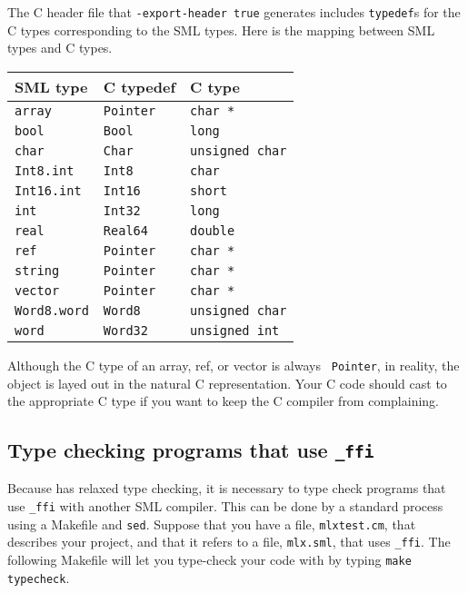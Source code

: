 The C header file that {\tt -export-header true} generates includes
{\tt typedef}s for the C types corresponding to the SML types.  Here
is the mapping between SML types and C types.

\begin{center}
\begin{tabular}{lll}
SML type & C typedef & C type\\
\hline
{\tt array} & {\tt Pointer} & {\tt char *} \\
{\tt bool} & {\tt Bool} & {\tt long} \\
{\tt char} & {\tt Char} & {\tt unsigned char} \\
{\tt Int8.int} & {\tt Int8} & {\tt char} \\
{\tt Int16.int} & {\tt Int16} & {\tt short} \\
{\tt int} & {\tt Int32} & {\tt long} \\
{\tt real} & {\tt Real64} & {\tt double} \\
{\tt ref} & {\tt Pointer} & {\tt char *} \\
{\tt string} & {\tt Pointer} & {\tt char *} \\
{\tt vector} & {\tt Pointer} & {\tt char *} \\
{\tt Word8.word} & {\tt Word8} & {\tt unsigned char} \\
{\tt word} & {\tt Word32} & {\tt unsigned int} \\
\end{tabular}
\end{center}

Although the C type of an array, ref, or vector is always {\tt
Pointer}, in reality, the object is layed out in the natural C
representation.  Your C code should cast to the appropriate C type if
you want to keep the C compiler from complaining.

\subsection{Type checking programs that use {\tt \_ffi}}

Because {\mlton} has relaxed type checking, it is necessary to
type check programs that use {\tt \_ffi} with another SML compiler.
This can be done by a standard process using a Makefile and {\tt sed}.
Suppose that you have a file, {\tt mlxtest.cm}, that describes your
{\mlton} project, and that it refers to a file, {\tt mlx.sml}, that
uses {\tt \_ffi}.  The following Makefile will let you type-check your
code with {\smlnj} by typing {\tt make typecheck}.

